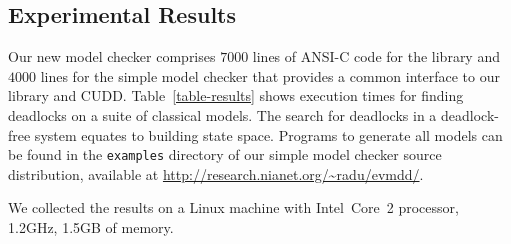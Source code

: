 \documentclass[nocover]             %
{NASA}                       %
\begin{document}
\subsection{Experimental Results}

Our new model checker comprises $7000$ lines of ANSI-C code for the library
and $4000$ lines for the simple model checker that provides a common interface
to our library and CUDD. Table~\vref{table-results} shows
execution times for finding deadlocks on a suite of classical models.
The search for deadlocks in a deadlock-free system equates to building state space.
Programs to generate all models can be found in the \texttt{examples} directory
of our simple model checker source distribution, available at \url{http://research.nianet.org/~radu/evmdd/}.

We collected the results on a Linux machine with Intel~Core~2 processor, 1.2GHz, 1.5GB of memory.
\end{document}
